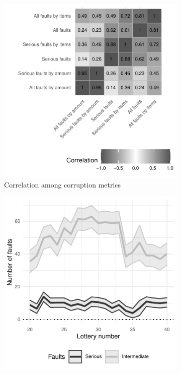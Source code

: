\documentclass[12pt,a4paper]{article}
\theoremstyle{definition}
\begin{document}
{\begin{figure}[H]
    \centering
    \begin{subfigure}[b]{0.49\textwidth}
        \centering
        \includegraphics{figures/corruptionCorrelation}
        \caption{Correlation among corruption metrics}
        \label{fig:corruptionCorrelation}
    \end{subfigure}
    \begin{subfigure}[b]{0.49\textwidth}
         \centering
         \includegraphics{figures/corruptionOverTime}

\end{subfigure}
\end{figure}}
\end{document}
